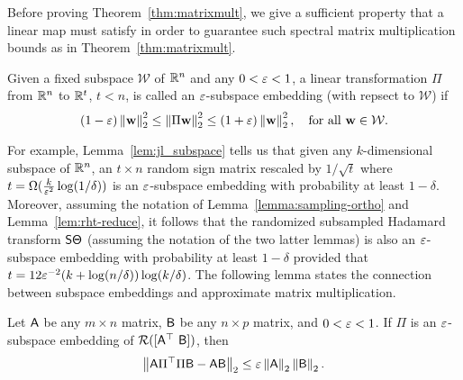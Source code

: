 Before proving Theorem~\ref{thm:matrixmult}, we give a sufficient property that a linear map must satisfy in order to guarantee such spectral matrix multiplication bounds as in Theorem~\ref{thm:matrixmult}.
\begin{definition}
Given a fixed subspace $\mathcal{W}$ of $\mathbb{R}^n$ and any $0<\varepsilon <1$, a linear transformation $\Pi$ from $\mathbb{R}^n$ to $\mathbb{R}^t$, $t<n$, is called an $\varepsilon$-subspace embedding (with repsect to $\mathcal{W}$) if
\[
(1-\varepsilon) \left\|{\mathbf{w}}\right\|_2^2 \leq \left\|\Pi {\mathbf{w}}\right\|_2^2 \leq (1+\varepsilon) \left\|{\mathbf{w}}\right\|_2^2,\quad \text{for all }{\mathbf{w}}\in \mathcal{W}.
\]
\end{definition}
For example, Lemma~\ref{lem:jl_subspace} tells us that given any $k$-dimensional subspace of $\mathbb{R}^n$, an $t\times n$ random sign matrix rescaled by $1/\sqrt{t}$ where $t=\Omega(\frac{k}{\varepsilon^2} \log(1/\delta))$ is an $\varepsilon$-subspace embedding with probability at least $1-\delta$. Moreover, assuming the notation of Lemma~\ref{lemma:sampling-ortho} and Lemma~\ref{lem:rht-reduce}, it follows that the randomized subsampled Hadamard transform ${\mathsf{S} }{\mathsf{\Theta} }$ (assuming the notation of the two latter lemmas) is also an $\varepsilon$-subspace embedding with probability at least $1-\delta$ provided that $t= 12\varepsilon^{-2}(k + \log(n/\delta))\log(k/\delta) $. The following lemma states the connection between subspace embeddings and approximate matrix multiplication.
\begin{lemma}
Let ${\mathsf{A} }$ be any $m\times n$ matrix, ${\mathsf{B} }$ be any $n \times p$ matrix, and $0<\varepsilon <1$. If $\Pi$ is an $\varepsilon$-subspace embedding of $\mathcal{R}([{\mathsf{A} }^\top\ {\mathsf{B} }])$, then
\[
\left\|{\mathsf{A} }\Pi^\top \Pi {\ensuremath{\mathsf{B} }} - {\mathsf{A} } {\mathsf{B} }\right\|_2 \leq \varepsilon \left\|{\mathsf{A} }\right\|_2\left\|{\mathsf{B} }\right\|_2.
\]
\end{lemma}

